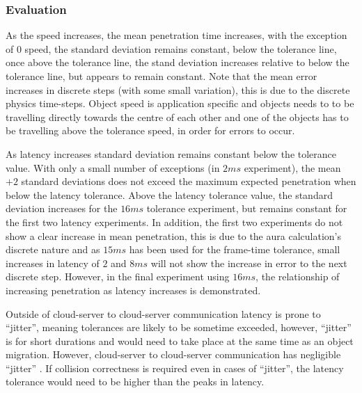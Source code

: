 \subsubsection{Evaluation}
As the speed increases, the mean penetration time increases, with the exception of 0 speed, the standard deviation remains constant, below the tolerance line, once above the tolerance line, the stand deviation increases relative to below the tolerance line, but appears to remain constant. Note that the mean error increases in discrete steps (with some small variation), this is due to the discrete physics time-steps. Object speed is application specific and objects needs to to be travelling directly towards the centre of each other and one of the objects has to be travelling above the tolerance speed, in order for errors to occur.

As latency increases standard deviation remains constant below the tolerance value. With only a small number of exceptions (in $2ms$ experiment), the mean $+2$ standard deviations does not exceed the maximum expected penetration when below the latency tolerance. Above the latency tolerance value, the standard deviation increases for the $16ms$ tolerance experiment, but remains constant for the first two latency experiments. In addition, the first two experiments do not show a clear increase in mean penetration, this is due to the aura calculation's discrete nature and as $15ms$ has been used for the frame-time tolerance, small increases in latency of $2$ and $8ms$ will not show the increase in error to the next discrete step. However, in the final experiment using $16ms$, the relationship of increasing penetration as latency increases is demonstrated.

Outside of cloud-server to cloud-server communication latency is prone to ``jitter'', meaning tolerances are likely to be sometime exceeded, however, ``jitter'' is for short durations and would need to take place at the same time as an object migration. However, cloud-server to cloud-server communication has negligible ``jitter'' \cite{ThousandEyesCloudPerf2018}. If collision correctness is required even in cases of ``jitter'', the latency tolerance would need to be higher than the peaks in latency. 

